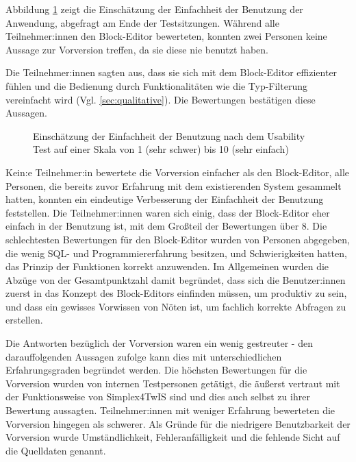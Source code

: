 Abbildung \ref{fig:ges} zeigt die Einschätzung der Einfachheit der Benutzung der Anwendung, abgefragt am Ende der Testsitzungen. Während alle Teilnehmer:innen den Block-Editor bewerteten, konnten zwei Personen keine Aussage zur Vorversion treffen, da sie diese nie benutzt haben.

Die Teilnehmer:innen sagten aus, dass sie sich mit dem Block-Editor effizienter fühlen und die Bedienung durch Funktionalitäten wie die Typ-Filterung vereinfacht wird (Vgl. \ref{sec:qualitative}). Die Bewertungen bestätigen diese Aussagen.

\begin{figure}[!ht]
  \datatable
  \centering
  \caption{Einschätzung der Einfachheit der Benutzung nach dem Usability
    Test auf einer Skala von 1 (sehr schwer) bis 10 (sehr einfach)}
  \label{fig:ges}
\end{figure}

Kein:e Teilnehmer:in bewertete die Vorversion einfacher als den Block-Editor, alle Personen, die bereits zuvor Erfahrung mit dem existierenden System gesammelt hatten, konnten ein eindeutige Verbesserung der Einfachheit der Benutzung feststellen. Die Teilnehmer:innen waren sich einig, dass der Block-Editor eher einfach in der Benutzung ist, mit dem Großteil der Bewertungen über 8. Die schlechtesten Bewertungen für den Block-Editor wurden von Personen abgegeben, die wenig \ac{SQL}- und Programmiererfahrung besitzen, und Schwierigkeiten hatten, das Prinzip der Funktionen korrekt anzuwenden. Im Allgemeinen wurden die Abzüge von der Gesamtpunktzahl damit begründet, dass sich die Benutzer:innen zuerst in das Konzept des Block-Editors einfinden müssen, um produktiv zu sein, und dass ein gewisses Vorwissen von Nöten ist, um fachlich korrekte Abfragen zu erstellen.

Die Antworten bezüglich der Vorversion waren ein wenig gestreuter - den darauffolgenden Aussagen zufolge kann dies mit unterschiedlichen Erfahrungsgraden begründet werden. Die höchsten Bewertungen für die Vorversion wurden von internen Testpersonen getätigt, die äußerst vertraut mit der Funktionsweise von Simplex4TwIS sind und dies auch selbst zu ihrer Bewertung aussagten. Teilnehmer:innen mit weniger Erfahrung bewerteten die Vorversion hingegen als schwerer. Als Gründe für die niedrigere Benutzbarkeit der Vorversion wurde Umständlichkeit, Fehleranfälligkeit und die fehlende Sicht auf die Quelldaten genannt.
